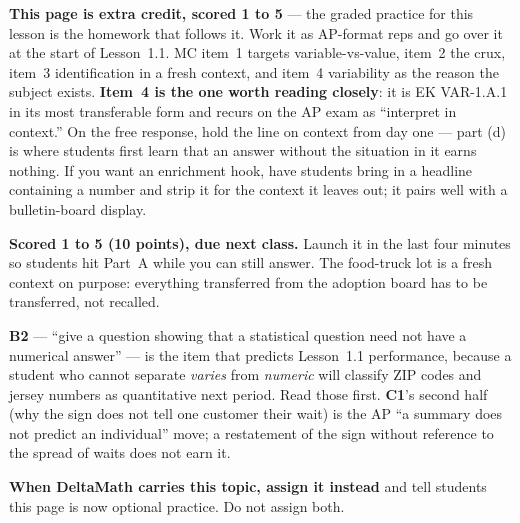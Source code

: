 \documentclass[10pt]{article}
\begin{document}
\begin{teachernote}[AP Practice]
\textbf{This page is extra credit, scored 1 to 5} --- the graded practice for this lesson is the homework that
follows it. Work it as AP-format reps and go over it at the start of Lesson~1.1. MC item~1
targets variable-vs-value, item~2 the crux, item~3 identification in a fresh context, and item~4
variability as the reason the subject exists. \textbf{Item~4 is the one worth reading closely}:
it is EK VAR-1.A.1 in its most transferable form and recurs on the AP exam as ``interpret in
context.'' On the free response, hold the line on context from day one --- part (d) is where
students first learn that an answer without the situation in it earns nothing. If you want an
enrichment hook, have students bring in a headline containing a number and strip it for the
context it leaves out; it pairs well with a bulletin-board display.
\end{teachernote}

\begin{teachernote}[Homework]
\textbf{Scored 1 to 5 (10 points), due next class.} Launch it in the last four minutes so students hit
Part~A while you can still answer. The food-truck lot is a fresh context on purpose: everything
transferred from the adoption board has to be transferred, not recalled.

\textbf{B2} --- ``give a question showing that a statistical question need not have a numerical
answer'' --- is the item that predicts Lesson~1.1 performance, because a student who cannot
separate \emph{varies} from \emph{numeric} will classify ZIP codes and jersey numbers as
quantitative next period. Read those first. \textbf{C1}'s second half (why the sign does not tell
one customer their wait) is the AP ``a summary does not predict an individual'' move; a
restatement of the sign without reference to the spread of waits does not earn it.

\textbf{When DeltaMath carries this topic, assign it instead} and tell students this page is now optional practice. Do not assign both.
\end{teachernote}
\end{document}
